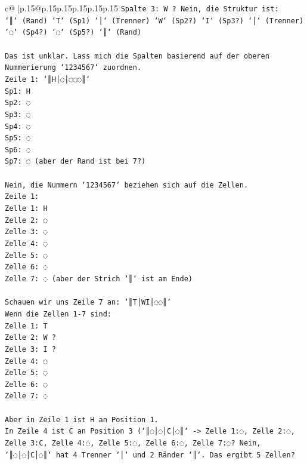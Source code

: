 \documentclass{article}
\begin{document}
{\begin{supertabular}{c@{$\;$}|p{.15\linewidth}@{}p{.15\linewidth}p{.15\linewidth}p{.15\linewidth}p{.15\linewidth}p{.15\linewidth}}
{{{\texttt{Spalte 3: W ? Nein, die Struktur ist:} \\
\texttt{`║` (Rand) `T` (Sp1) `│` (Trenner) `W` (Sp2?) `I` (Sp3?) `│` (Trenner) `◌` (Sp4?) `◌` (Sp5?) `║` (Rand)} \\
\\ 
\texttt{Das ist unklar. Lass mich die Spalten basierend auf der oberen Nummerierung `1234567` zuordnen.} \\
\texttt{Zeile 1: `║H│◌│◌◌◌║`} \\
\texttt{Sp1: H} \\
\texttt{Sp2: ◌} \\
\texttt{Sp3: ◌} \\
\texttt{Sp4: ◌} \\
\texttt{Sp5: ◌} \\
\texttt{Sp6: ◌} \\
\texttt{Sp7: ◌ (aber der Rand ist bei 7?)} \\
\\ 
\texttt{Nein, die Nummern `1234567` beziehen sich auf die Zellen.} \\
\texttt{Zeile 1:} \\
\texttt{Zelle 1: H} \\
\texttt{Zelle 2: ◌} \\
\texttt{Zelle 3: ◌} \\
\texttt{Zelle 4: ◌} \\
\texttt{Zelle 5: ◌} \\
\texttt{Zelle 6: ◌} \\
\texttt{Zelle 7: ◌ (aber der Strich `║` ist am Ende)} \\
\\ 
\texttt{Schauen wir uns Zeile 7 an: `║T│WI│◌◌║`} \\
\texttt{Wenn die Zellen 1{-}7 sind:} \\
\texttt{Zelle 1: T} \\
\texttt{Zelle 2: W ?} \\
\texttt{Zelle 3: I ?} \\
\texttt{Zelle 4: ◌} \\
\texttt{Zelle 5: ◌} \\
\texttt{Zelle 6: ◌} \\
\texttt{Zelle 7: ◌} \\
\\ 
\texttt{Aber in Zeile 1 ist H an Position 1.} \\
\texttt{In Zeile 4 ist C an Position 3 (`║◌│◌│C│◌║` {-}> Zelle 1:◌, Zelle 2:◌, Zelle 3:C, Zelle 4:◌, Zelle 5:◌, Zelle 6:◌, Zelle 7:◌? Nein, `║◌│◌│C│◌║` hat 4 Trenner `│` und 2 Ränder `║`. Das ergibt 5 Zellen?} \\
}}}
\end{supertabular}}
\end{document}
